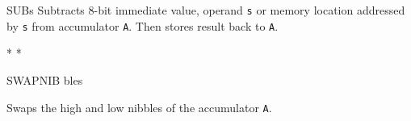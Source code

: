 \begin{basedescript}{
	\desclabelstyle{\multilinelabel}
	\desclabelwidth{3cm}}
\begin{DetailItem}{SUB}{s}
		Subtracts 8-bit immediate value, operand {\tt s} or memory location addressed by {\tt s} from accumulator {\tt A}. Then stores result back to {\tt A}.

		\begin{DetailEffects}[v]
			\FlagsSUBr
		\end{DetailEffects}

		\begin{DetailEffectsFlags}
			\DetailFlagSF{\DetailFlagResultSign}
			\DetailFlagZF{\DetailFlagResultZero}
			\DetailFlagHF{\DetailFlagResultHalfBorrow*}*
			\DetailFlagPV{\DetailFlagResultOverflow}*
			\DetailFlagCF{\DetailFlagResultBorrow*}
		\end{DetailEffectsFlags}

		\begin{DetailTiming}
		\end{DetailTiming}

	\end{DetailItem}

	\pagebreak


	\begin{DetailItem}{SWAPNIB}{\DetailItemZXN}
		{ bles}
		{\SymSWAPNIB}

		Swaps the high and low nibbles of the accumulator {\tt A}.

		\begin{DetailEffects}
			\FlagsSWAPNIB
		\end{DetailEffects}
						
		\begin{DetailTiming}
			\DetailTime{2}{8}
		\end{DetailTiming}

	\end{DetailItem}



\end{basedescript}
